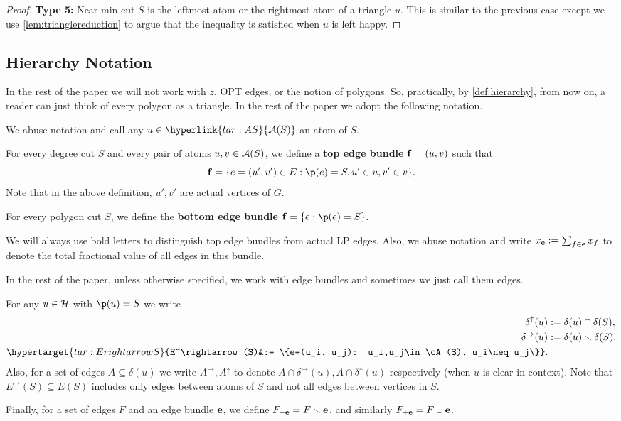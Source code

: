 \begin{proof}
	{\bf Type 5:} Near min cut $S$ is the leftmost atom or the rightmost atom of a triangle $u$. This is similar to the previous case except we use \cref{lem:trianglereduction} to argue that the inequality is satisfied when $u$ is left happy.
\end{proof}





\subsection{Hierarchy Notation}
\label{sec:hierarchynotation}
In the rest of the paper we will not work with $z$, OPT edges, or the notion of polygons. So, practically, by \cref{def:hierarchy}, from now on,  a reader can just think of every polygon as a triangle.
In the rest of the paper we adopt the following notation.

 We abuse notation and call any $u\in\hyperlink{tar:AS}{\cA(S)}$ an atom of $S$. 
\begin{definition}\label{def:edgebundletopcut}
 For every degree cut $S$ and every pair of atoms $u,v\in{\cal A}(S)$,  we define a \textbf{top edge bundle} ${\bf f}=(u,v)$ such that 
	$$\bbf= \{e=(u',v') \in E : \p(e) = S, u'\in u, v'\in v\}.$$
	 Note that in the above definition, $u',v'$ are actual vertices of $G$.
	 
For every polygon cut $S$, we define the \textbf{bottom edge bundle} $\bbf=\{e: \p(e)=S\}$. 
\end{definition}
We will always use bold letters to distinguish top edge bundles from actual LP edges. Also, we abuse notation and write $x_{\bf e}:=\sum_{f\in{\bf e}}x_f$ to denote the total fractional value of all edges in this bundle.

In the rest of the paper, unless otherwise specified, we work with edge bundles and sometimes we just call them edges.

 For any $u\in\mathcal{H}$ with $\p(u)=S$ we write
\begin{align*} 
\delta^\uparrow(u)&:=\delta(u)\cap\delta(S),\\
\delta^\rightarrow(u)&:=\delta(u)\smallsetminus\delta(S).\\
\hypertarget{tar:ErightarrowS}{E^\rightarrow (S)&:= \{e=(u_i, u_j): u_i,u_j\in\cA(S), u_i\neq u_j\}}.
\end{align*}
Also, for a set of edges $A\subseteq \delta(u)$ we write $A^\rightarrow, A^\uparrow$ to denote $A\cap\delta^\rightarrow(u), A\cap\delta^\uparrow(u)$ respectively (when $u$ is clear in context).
Note that $E^\rightarrow(S)\subseteq E(S)$ includes only edges between atoms of $S$ and not all edges between vertices in $S$.  

Finally, for a set of edges $F$ and an edge bundle ${\bf e}$, we define $F_{-{\bf e}} = F \smallsetminus {\bf e}$, and similarly $F_{+{\bf e}} = F \cup {\bf e}$.



